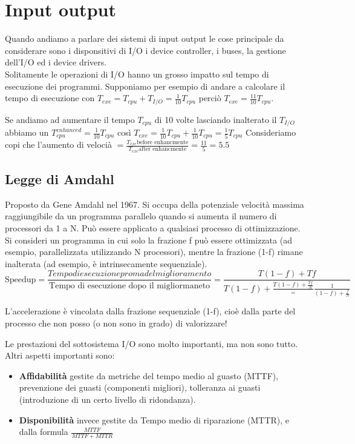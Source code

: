 \section{Input output}
Quando andiamo a parlare dei sistemi di input output le cose principale da considerare sono i 
disponsitivi di I/O i device controller, i buses, la gestione dell'I/O ed i device drivers.\\

Solitamente le operazioni di I/O hanno un grosso impatto sul tempo di esecuzione dei programmi.
Supponiamo per esempio di andare a calcolare il tempo di esecuzione con \(T_{exe} = T_{cpu} + T_{I/O} = \frac{1}{10}T_{cpu}\) perciò
\(T_{exe} = \frac{11}{10}T_{cpu}\).

Se andiamo ad aumentare il tempo \(T_{cpu}\) di 10 volte lasciando inalterato il \(T_{I/O}\) abbiamo
un \(T_{cpu}^{enhanced} = \frac{1}{10} T_{cpu}\) così \(T_{exe} = \frac{1}{10}T_{cpu} + \frac{1}{10}T_{cpu} = \frac{1}{5}T_{cpu}\)
Consideriamo copi che l'aumento di velocià \(= \frac{T_{exe} \text{before enhancmente}}{T_{exe} \text{after enhancmente}} = \frac{11}{5} = 5.5\)

\subsection{Legge di Amdahl}
Proposto da Gene Amdahl nel 1967. Si occupa della potenziale velocità massima raggiungibile da un programma parallelo quando si aumenta il numero di processori da 1 a N.
Può essere applicato a qualsiasi processo di ottimizzazione. 
Si consideri un programma in cui solo la frazione f può essere ottimizzata (ad esempio, parallelizzata utilizzando N processori), mentre la frazione (1-f) rimane inalterata (ad esempio, è intrinsecamente sequenziale).
\[\text{Speedup} = \frac{Tempo di esecuzione proma del miglioramento}{\text{Tempo di esecuzione dopo il migliormaneto}} = \frac{T(1- f) + Tf}{T(1 - f) + \frac{T(1-f) + \frac{Tf}{N}} = \frac{1}{(1 - f) + \frac{f}{N}}}\]

\begin{observation}
    L'accelerazione è vincolata dalla frazione sequenziale (1-f), cioè dalla parte del processo che non posso (o non sono in grado) di valorizzare!
\end{observation}

\hspace{-15pt}
Le prestazioni del sottosistema I/O sono molto importanti, ma non sono tutto. Altri aspetti importanti sono:
\begin{itemize}
    \item \textbf{Affidabilità} gestite da metriche del tempo medio al guasto (MTTF), prevenzione dei guasti (componenti migliori), tolleranza ai guasti (introduzione di un certo livello di ridondanza).
    \item \textbf{Disponibilità} invece gestite da Tempo medio di riparazione (MTTR), e dalla formula \(\frac{MTTF}{MTTF + MTTR}\)
\end{itemize}

